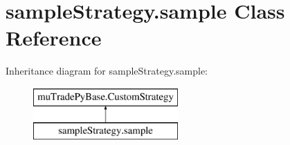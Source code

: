 \hypertarget{classsampleStrategy_1_1sample}{\section{sample\-Strategy.\-sample Class Reference}
\label{classsampleStrategy_1_1sample}
}
Inheritance diagram for sample\-Strategy.\-sample\-:\begin{figure}[H]
\begin{center}
\leavevmode
\includegraphics[height=2.000000cm]{classsampleStrategy_1_1sample}
\end{center}
\end{figure}
